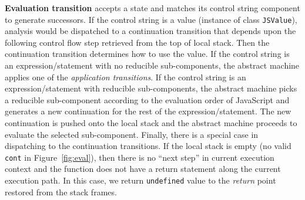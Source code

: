\documentclass[12pt]{report}
\begin{document}
\textbf{Evaluation transition} accepts a state and matches its control string component to generate successors.
If the control string is a value (instance of class \verb|JSValue|), analysis would be dispatched to a continuation transition that depends upon the following control flow step retrieved from the top of local stack. Then the continuation transition determines how to use the value.
If the control string is an expression/statement with no reducible sub-components, the abstract machine applies one of the {\em application transitions}.
If the control string is an expression/statement with reducible sub-components, the abstract machine picks a reducible sub-component according to the evaluation order of JavaScript and generates a new continuation for the rest of the expression/statement.
The new continuation is pushed onto the local stack and the abstract machine proceeds to evaluate the selected sub-component.
Finally, there is a special case in dispatching to the continuation transitions. If the local stack is empty (no valid \verb|cont| in Figure~\ref{fig:eval}), then there is no ``next step'' in current execution context and the function does not have a return statement along the current execution path.
In this case, we return \verb|undefined| value to the {\em return} point restored from the stack frames.
\end{document}
